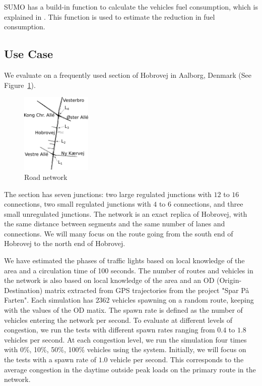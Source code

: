 SUMO has a build-in function to calculate the vehicles fuel consumption, which is explained in \cite{SUMOFuel}.
This function is used to estimate the reduction in fuel consumption.

\subsection{Use Case}\label{sec:UseCase}
We evaluate \tech on a frequently used section of Hobrovej in Aalborg, Denmark (See Figure~\ref{fig:Introduction:hobro}).

\begin{figure}[htb]
\centering
\includegraphics[width=0.3\textwidth]{../images/HobrovejNy.png}
\caption{Road network}
\label{fig:Introduction:hobro}
\end{figure}

The section has seven junctions: two large regulated junctions with $12$ to $16$ connections, two small regulated junctions with $4$ to $6$ connections, and three small unregulated junctions.
The network is an exact replica of Hobrovej, with the same distance between segments and the same number of lanes and connections.
We will many focus on the route going from the south end of Hobrovej to the north end of Hobrovej.

We have estimated the phases of traffic lights based on local knowledge of the area and a circulation time of 100 seconds.
The number of routes and vehicles in the network is also based on local knowledge of the area and an OD (Origin-Destination) matrix extracted from GPS trajectories from the project "Spar På Farten"\cite{SparPaFarten}.
Each simulation has $2362$ vehicles spawning on a random route, keeping with the values of the OD matix.
The spawn rate is defined as the number of vehicles entering the network per second.
To evaluate \tech at different levels of congestion, we run the tests with different spawn rates ranging from $0.4$ to $1.8$ vehicles per second.
At each congestion level, we run the simulation four times with 0\%, 10\%, 50\%, 100\% vehicles using the system.
Initially, we will focus on the tests with a spawn rate of $1.0$ vehicle per second. %
This corresponds to the average congestion in the daytime outside peak loads on the primary route in the network.

